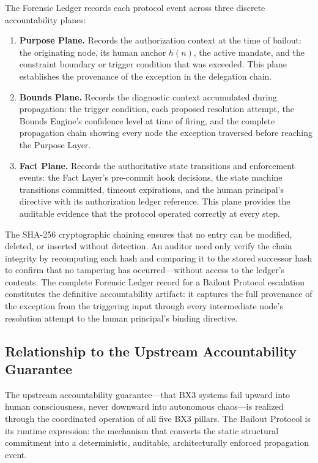 The Forensic Ledger records each protocol event across three discrete
accountability planes:

\begin{enumerate}\itemsep=0pt
\item \textbf{Purpose Plane.}  Records the authorization context at the time of
bailout: the originating node, its human anchor $h(n)$, the active mandate, and
the constraint boundary or trigger condition that was exceeded.  This plane
establishes the provenance of the exception in the delegation chain.

\item \textbf{Bounds Plane.}  Records the diagnostic context accumulated during
propagation: the trigger condition, each proposed resolution attempt, the
Bounds Engine's confidence level at time of firing, and the complete propagation
chain showing every node the exception traversed before reaching the Purpose
Layer.

\item \textbf{Fact Plane.}  Records the authoritative state transitions and
enforcement events: the Fact Layer's pre-commit hook decisions, the state machine
transitions committed, timeout expirations, and the human principal's directive
with its authorization ledger reference.  This plane provides the auditable
evidence that the protocol operated correctly at every step.
\end{enumerate}

The SHA-256 cryptographic chaining ensures that no entry can be modified,
deleted, or inserted without detection.  An auditor need only verify the chain
integrity by recomputing each hash and comparing it to the stored successor hash
to confirm that no tampering has occurred---without access to the ledger's
contents.  The complete Forensic Ledger record for a Bailout Protocol escalation
constitutes the definitive accountability artifact: it captures the full
provenance of the exception from the triggering input through every intermediate
node's resolution attempt to the human principal's binding directive.

\subsection{Relationship to the Upstream Accountability Guarantee}
\label{sec:bailout-accountability}

The upstream accountability guarantee---that BX3 systems fail upward into human
consciousness, never downward into autonomous chaos---is realized through the
coordinated operation of all five BX3 pillars.  The Bailout Protocol is its
runtime expression: the mechanism that converts the static structural commitment
into a deterministic, auditable, architecturally enforced propagation event.

